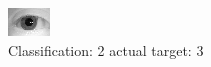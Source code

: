 \begin{figure}[h!]
\begin{center}
\includegraphics[width=0.60\columnwidth]{figures/ID1131_class_2_target_3.png}
\end{center}
\caption{ Classification: 2 actual target: 3}
\label{fig:ID1131_class_2_target_3}
\end{figure}
